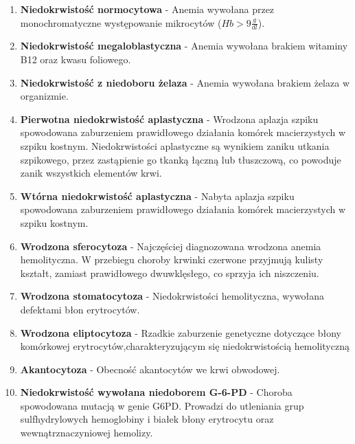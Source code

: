 \documentclass[runningheads]{llncs}
\begin{document}
\begin{enumerate}
    \item \textbf{Niedokrwistość normocytowa} -
    Anemia wywołana przez monochromatyczne występowanie mikrocytów ($Hb > 9 \frac{g}{dl}$).
    
    \item \textbf{Niedokrwistość megaloblastyczna} -
    Anemia wywołana brakiem witaminy B12 oraz kwasu foliowego.
    
    \item \textbf{Niedokrwistość z niedoboru żelaza} -
    Anemia wywołana brakiem żelaza w organizmie.
    
   \item \textbf{Pierwotna niedokrwistość aplastyczna} -
   Wrodzona aplazja szpiku spowodowana zaburzeniem prawidłowego działania komórek macierzystych w szpiku kostnym. Niedokrwistości aplastyczne są wynikiem zaniku utkania szpikowego, przez zastąpienie go tkanką łączną lub tłuszczową, co powoduje zanik wszystkich elementów krwi.
   
    \item \textbf{Wtórna niedokrwistość aplastyczna} -
    Nabyta aplazja szpiku spowodowana zaburzeniem prawidłowego działania komórek macierzystych w szpiku kostnym.
      
    \item \textbf{Wrodzona sferocytoza} -
   Najczęściej diagnozowana wrodzona anemia hemolityczna. W przebiegu choroby krwinki czerwone przyjmują kulisty kształt, zamiast prawidłowego dwuwklęsłego, co sprzyja ich niszczeniu.
    
   \item \textbf{Wrodzona stomatocytoza} -
   Niedokrwistości hemolityczna, wywołana defektami błon erytrocytów.
    
   \item \textbf{Wrodzona eliptocytoza} -
   Rzadkie zaburzenie genetyczne dotyczące błony komórkowej erytrocytów,charakteryzującym się niedokrwistością hemolityczną
   
   \item \textbf{Akantocytoza} -
    Obecność akantocytów we krwi obwodowej.

   \item \textbf{Niedokrwistość wywołana niedoborem G-6-PD} -
    Choroba spowodowana mutacją w genie G6PD. Prowadzi do utleniania grup sulfhydrylowych hemoglobiny i białek błony erytrocytu oraz wewnątrznaczyniowej hemolizy.
    

\end{enumerate}
\end{document}
